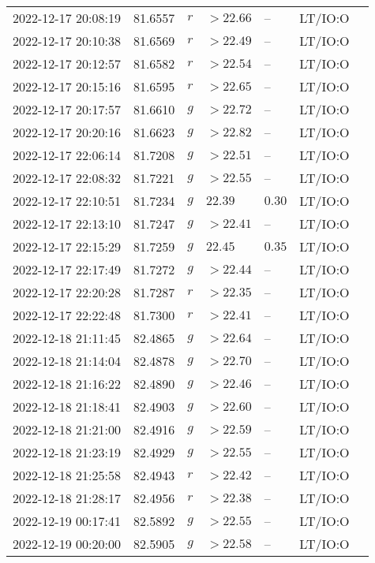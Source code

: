 \documentclass{nature_plusfigure}
\begin{document}
\begin{supplement}
\begin{center}
\begin{longtable}{lllllll}
2022-12-17 20:08:19 & 81.6557 & $r$ & $>22.66$ & -- & LT/IO:O &  \\ 
2022-12-17 20:10:38 & 81.6569 & $r$ & $>22.49$ & -- & LT/IO:O &  \\ 
2022-12-17 20:12:57 & 81.6582 & $r$ & $>22.54$ & -- & LT/IO:O &  \\ 
2022-12-17 20:15:16 & 81.6595 & $r$ & $>22.65$ & -- & LT/IO:O &  \\ 
2022-12-17 20:17:57 & 81.6610 & $g$ & $>22.72$ & -- & LT/IO:O &  \\ 
2022-12-17 20:20:16 & 81.6623 & $g$ & $>22.82$ & -- & LT/IO:O &  \\ 
2022-12-17 22:06:14 & 81.7208 & $g$ & $>22.51$ & -- & LT/IO:O &  \\ 
2022-12-17 22:08:32 & 81.7221 & $g$ & $>22.55$ & -- & LT/IO:O &  \\ 
2022-12-17 22:10:51 & 81.7234 & $g$ & $22.39$ & $0.30$ & LT/IO:O &  \\ 
2022-12-17 22:13:10 & 81.7247 & $g$ & $>22.41$ & -- & LT/IO:O &  \\ 
2022-12-17 22:15:29 & 81.7259 & $g$ & $22.45$ & $0.35$ & LT/IO:O &  \\ 
2022-12-17 22:17:49 & 81.7272 & $g$ & $>22.44$ & -- & LT/IO:O &  \\ 
2022-12-17 22:20:28 & 81.7287 & $r$ & $>22.35$ & -- & LT/IO:O &  \\ 
2022-12-17 22:22:48 & 81.7300 & $r$ & $>22.41$ & -- & LT/IO:O &  \\ 
2022-12-18 21:11:45 & 82.4865 & $g$ & $>22.64$ & -- & LT/IO:O &  \\ 
2022-12-18 21:14:04 & 82.4878 & $g$ & $>22.70$ & -- & LT/IO:O &  \\ 
2022-12-18 21:16:22 & 82.4890 & $g$ & $>22.46$ & -- & LT/IO:O &  \\ 
2022-12-18 21:18:41 & 82.4903 & $g$ & $>22.60$ & -- & LT/IO:O &  \\ 
2022-12-18 21:21:00 & 82.4916 & $g$ & $>22.59$ & -- & LT/IO:O &  \\ 
2022-12-18 21:23:19 & 82.4929 & $g$ & $>22.55$ & -- & LT/IO:O &  \\ 
2022-12-18 21:25:58 & 82.4943 & $r$ & $>22.42$ & -- & LT/IO:O &  \\ 
2022-12-18 21:28:17 & 82.4956 & $r$ & $>22.38$ & -- & LT/IO:O &  \\ 
2022-12-19 00:17:41 & 82.5892 & $g$ & $>22.55$ & -- & LT/IO:O &  \\ 
2022-12-19 00:20:00 & 82.5905 & $g$ & $>22.58$ & -- & LT/IO:O &  \\ 

\end{longtable}
\end{center}
\end{supplement}
\end{document}
